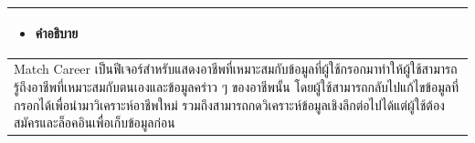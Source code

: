 \begin{table}[H]
\begin{tabular}{|l|}
\begin{minipage}{\linewidth}
  \begin{itemize}
    \item คำอธิบาย
  \end{itemize}
\end{minipage}                                                                                                                                                                                                                                                                                                                                                                                                                                                                                                                                 \\ \hline
\begin{minipage}{\linewidth}
  \raggedright
Match Career เป็นฟีเจอร์สำหรับแสดงอาชีพที่เหมาะสมกับข้อมูลที่ผู้ใช้กรอกมาทำให้ผู้ใช้สามารถรู้ถึงอาชีพที่เหมาะสมกับตนเองและข้อมูลคร่าว ๆ ของอาชีพนั้น โดยผู้ใช้สามารถกลับไปแก้ไขข้อมูลที่กรอกได้เพื่อนำมาวิเคราะห์อาชีพใหม่ รวมถึงสามารถกดวิเคราะห์ข้อมูลเชิงลึกต่อไปได้แต่ผู้ใช้ต้องสมัครและล็อคอินเพื่อเก็บข้อมูลก่อน
\end{minipage}
\\ \hline
\end{tabular}
\end{table}

